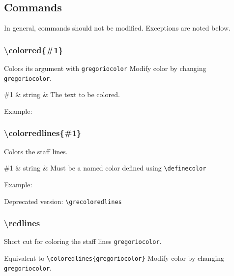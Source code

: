 \subsection{Commands}

In general, commands should not be modified.  Exceptions are noted below.

\subsubsection*{\textbackslash colorred\{\#1\}}
Colors its argument with \verb=gregoriocolor= Modify color by changing
\verb=gregoriocolor=.

\begin{argtable}
  \#1 & string & The text to be colored. \\
\end{argtable}

Example:\par\medskip
\begin{latexcode}
\end{latexcode}

\subsubsection*{\textbackslash colorredlines\{\#1\}}
Colors the staff lines.

\begin{argtable}
  \#1 & string & Must be a named color defined using \verb=\definecolor= \\
\end{argtable}

Example:\par\medskip
\begin{latexcode}
\end{latexcode}

\smallskip\hskip 15pt Deprecated version: \verb=\grecoloredlines=

\subsubsection*{\textbackslash redlines}
Short cut for coloring the staff lines \verb=gregoriocolor=.

Equivalent to \verb=\coloredlines{gregoriocolor}= Modify color by
changing \verb=gregoriocolor=.


